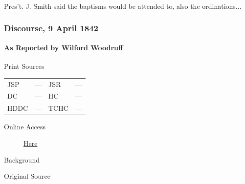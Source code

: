 					Pres't. J. Smith said the baptisms would be attended to, also the ordinations...
					
		\subsubsection{Discourse, 9 April 1842}
			\label{EMS-1842-JS-9-APR-1842}
			
			\paragraph{As Reported by Wilford Woodruff}
				\label{EMS-1842-JS-9-APR-1842-WW}
			
				\begin{description}
					\item[Print Sources]
				\end{description}

				\begin{tabular}{p{0.5in}p{1in}p{0.5in}p{1in}}
					JSP	 	& ---		& JSR 		& --- \\
					DC	 	& ---		& HC 		& --- \\
					HDDC 	& ---		& TCHC 		& --- \\
				\end{tabular}
				
				\begin{description}
					\item[Online Access] \href{https://www.josephsmithpapers.org/paper-summary/discourse-9-april-1842-as-reported-by-wilford-woodruff/1}{Here}
				\end{description}
				
				\begin{description}
					\item[Background]
				\end{description}
				
				
				\begin{description}
					\item[Original Source]
				\end{description}
				

